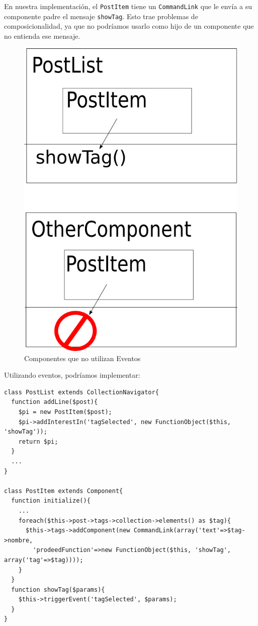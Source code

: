 En nuestra implementación, el \verb"PostItem" tiene un \verb"CommandLink" que le envía a su componente padre el mensaje \verb"showTag". Esto trae problemas de composicionalidad, ya que no podríamos usarlo como hijo de un componente que no entienda ese mensaje.
\begin{figure}
	\centering
	\includegraphics*[scale=0.20]{images/componentes.png}
 	\caption{Componentes que no utilizan Eventos}
 	\label{fig-comp1}
\end{figure}


Utilizando eventos, podríamos implementar:

\begin{verbatim}
class PostList extends CollectionNavigator{
  function addLine($post){
    $pi = new PostItem($post);
    $pi->addInterestIn('tagSelected', new FunctionObject($this, 'showTag'));
    return $pi;
  }
  ...
}

class PostItem extends Component{
  function initialize(){
    ...
    foreach($this->post->tags->collection->elements() as $tag){
      $this->tags->addComponent(new CommandLink(array('text'=>$tag->nombre,
        'prodeedFunction'=>new FunctionObject($this, 'showTag', array('tag'=>$tag))));
    }
  }
  function showTag($params){
    $this->triggerEvent('tagSelected', $params);
  }
}

\end{verbatim}

